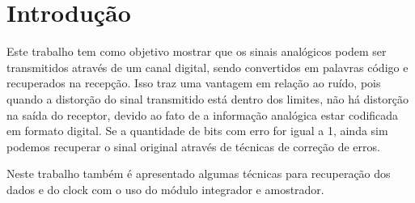 \newpage
\section{Introdução}
Este trabalho tem como objetivo mostrar que os sinais analógicos podem ser transmitidos através de um canal digital, sendo convertidos em palavras código e recuperados na recepção. Isso traz uma vantagem em relação ao ruído, pois quando a distorção do sinal transmitido está dentro dos limites, não há distorção na saída do receptor, devido ao fato de a informação analógica estar codificada em formato digital. Se a quantidade de bits com erro for igual a 1, ainda sim podemos recuperar o sinal original através de técnicas de correção de erros.

Neste trabalho também é apresentado algumas técnicas para recuperação dos dados e do clock com o uso do módulo integrador e amostrador.